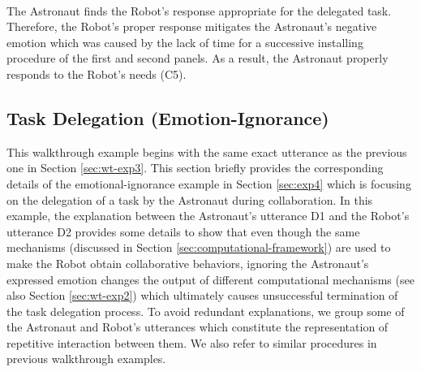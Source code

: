 \noindent{}\\

The Astronaut finds the Robot's response appropriate for the delegated task.
Therefore, the Robot's proper response mitigates the Astronaut's negative
emotion which was caused by the lack of time for a successive installing
procedure of the first and second panels. As a result, the Astronaut properly
responds to the Robot's needs (C5).\\

\noindent{}

\subsection{Task Delegation (Emotion-Ignorance)}
\label{sec:wt-exp4}

This walkthrough example begins with the same exact utterance as the previous
one in Section \ref{sec:wt-exp3}. This section briefly provides the
corresponding details of the emotional-ignorance example in Section
\ref{sec:exp4} which is focusing on the delegation of a task by the Astronaut during
collaboration. In this example, the explanation between the Astronaut's
utterance D1 and the Robot's utterance D2 provides some details to show that
even though the same mechanisms (discussed in Section
\ref{sec:computational-framework}) are used to make the Robot obtain
collaborative behaviors, ignoring the Astronaut's expressed emotion changes the
output of different computational mechanisms (see also Section
\ref{sec:wt-exp2}) which ultimately causes unsuccessful termination of the task
delegation process. To avoid redundant explanations, we group some of the
Astronaut and Robot's utterances which constitute the representation of
repetitive interaction between them. We also refer to similar procedures in
previous walkthrough examples.\\

\noindent{}\\

